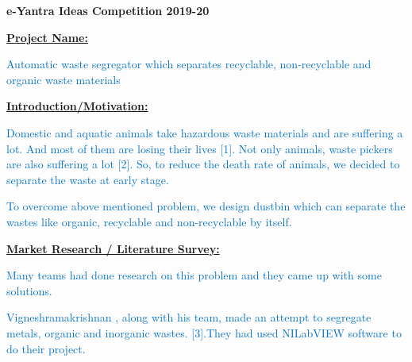 \documentclass[12pt]{article}
\begin{document}
\tab \tab {}\par

\setlength{\parskip}{8.04pt}
\begin{Center}
{\fontsize{18pt}{21.6pt}\selectfont \textbf{e-Yantra Ideas Competition 2019-20}\par}
\end{Center}\par


\vspace{\baselineskip}
{\fontsize{14pt}{16.8pt}\selectfont \textbf{\uline{Project Name:}}\par}\tab \par

\textcolor[HTML]{0070C0}{Automatic waste segregator which separates recyclable, non-recyclable and organic waste materials}\par


\vspace{\baselineskip}
{\fontsize{14pt}{16.8pt}\selectfont \textbf{\uline{Introduction/Motivation:}}\par}\par

\textcolor[HTML]{0070C0}{Domestic and aquatic animals take hazardous waste materials and are suffering a lot. And most of them are losing their lives [1]. Not only animals, waste pickers are also suffering a lot [2]. So, to reduce the death rate of animals, we decided to separate the waste at early stage.}\par

\textcolor[HTML]{0070C0}{To overcome above mentioned problem, we design dustbin which can separate the wastes like organic, recyclable and non-recyclable by itself. }\par

{\fontsize{14pt}{16.8pt}\selectfont \textbf{\uline{Market Research / Literature Survey:}}\par}\par

\textcolor[HTML]{0070C0}{Many teams had done research on this problem and they came up with some solutions. }\par

\textcolor[HTML]{0070C0}{Vigneshramakrishnan , along with his team, made an attempt to segregate metals, organic and inorganic wastes. [3].They had used NILabVIEW software to do their project. }\par
\end{document}

